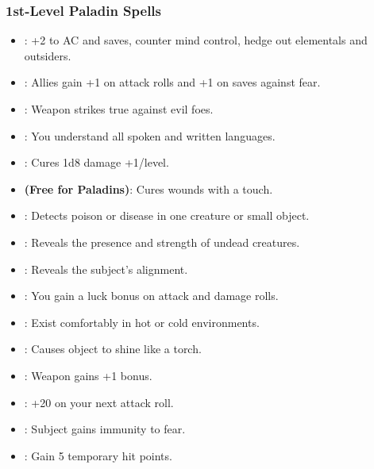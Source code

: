 \subsubsection{1st-Level Paladin Spells}
\begin{itemize}
\item {}: +2 to AC and saves, counter mind control, hedge out elementals and outsiders.
\item {}: Allies gain +1 on attack rolls and +1 on saves against fear.
\item {}: Weapon strikes true against evil foes.
\item {}: You understand all spoken and written languages.
\item {}: Cures 1d8 damage +1/level.
\item {} \textbf{(Free for Paladins)}: Cures wounds with a touch.
\item {}: Detects poison or disease in one creature or small object.
\item {}: Reveals the presence and strength of undead creatures.
\item {}: Reveals the subject's alignment.
\item {}: You gain a luck bonus on attack and damage rolls.
\item {}: Exist comfortably in hot or cold environments.
\item {}: Causes object to shine like a torch.
\item {}: Weapon gains +1 bonus.
\item {}: +20 on your next attack roll.
\item {}: Subject gains immunity to fear.
\item {}: Gain 5 temporary hit points.
\end{itemize}

